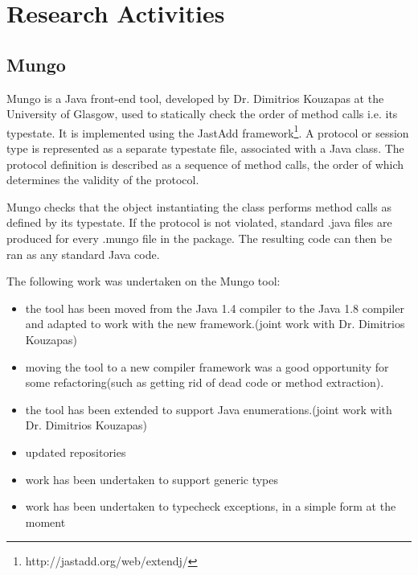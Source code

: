 \section{Research Activities}
\label{Research}

\subsection{Mungo}
\label{sub:Mungo}
Mungo\cite{mungo} is a Java front-end tool, developed by Dr. Dimitrios Kouzapas at the University of Glasgow, used to statically check the order of method calls i.e. its typestate. It is implemented using the JastAdd framework\footnote{http://jastadd.org/web/extendj/}\cite{jastadd}. A protocol or session type is represented as a separate typestate file, associated with a Java class.  The protocol definition is described as a sequence of method calls, the order of which determines the validity of the protocol.

Mungo checks that the object instantiating the class performs method calls as defined by its typestate. If the protocol is not violated, standard .java files are produced for every .mungo file in the package.  The resulting code can then be ran as any standard Java code.


The following work was undertaken on the Mungo tool:
\begin{itemize}
  \item the tool has been moved from the Java 1.4 compiler to the Java 1.8 compiler and adapted to work with the new framework.(joint work with Dr. Dimitrios Kouzapas)
  \item moving the tool to a new compiler framework was a good opportunity for some refactoring(such as getting rid of dead code or method extraction).
  \item the tool has been extended to support Java enumerations.(joint work with Dr. Dimitrios Kouzapas)
  \item updated repositories
  \item work has been undertaken to support generic types
  \item work has been undertaken to typecheck exceptions, in a simple form at the moment
\end{itemize}


